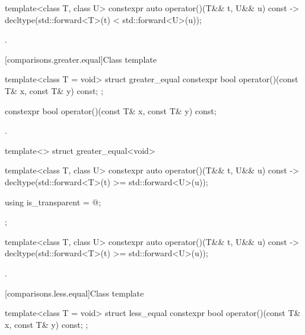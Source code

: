 %
\begin{itemdecl}
template<class T, class U> constexpr auto operator()(T&& t, U&& u) const
    -> decltype(std::forward<T>(t) < std::forward<U>(u));
\end{itemdecl}

\begin{itemdescr}
\pnum
\returns
{}.
\end{itemdescr}

[comparisons.greater.equal]{Class template }

%
\begin{itemdecl}
template<class T = void> struct greater_equal {
  constexpr bool operator()(const T& x, const T& y) const;
};
\end{itemdecl}

%
\begin{itemdecl}
constexpr bool operator()(const T& x, const T& y) const;
\end{itemdecl}

\begin{itemdescr}
\pnum
\returns
{}.
\end{itemdescr}

%
\begin{itemdecl}
template<> struct greater_equal<void> {
  template<class T, class U> constexpr auto operator()(T&& t, U&& u) const
    -> decltype(std::forward<T>(t) >= std::forward<U>(u));

  using is_transparent = @\unspec@;
};
\end{itemdecl}

%
\begin{itemdecl}
template<class T, class U> constexpr auto operator()(T&& t, U&& u) const
    -> decltype(std::forward<T>(t) >= std::forward<U>(u));
\end{itemdecl}

\begin{itemdescr}
\pnum
\returns
{}.
\end{itemdescr}

[comparisons.less.equal]{Class template }

%
\begin{itemdecl}
template<class T = void> struct less_equal {
  constexpr bool operator()(const T& x, const T& y) const;
};
\end{itemdecl}

